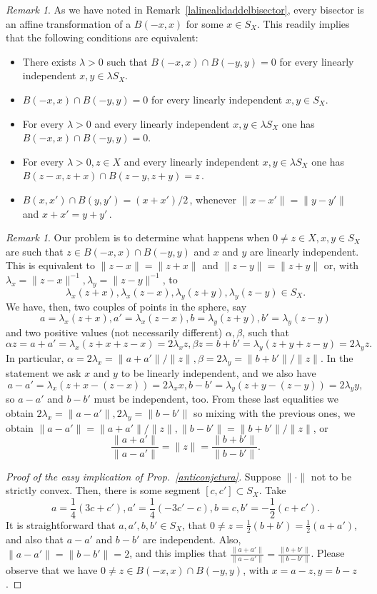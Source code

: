 \documentclass[12pt]{amsproc}
\theoremstyle{remark}
\newtheorem{nota}[theorem]{Remark}
\newtheorem{remark}[theorem]{Remark}
\def\norma{\|\cdot\|}
\begin{document}
\begin{nota}
As we have noted in Remark~\ref{lalinealidaddelbisector}, every bisector is an affine 
transformation of a $B(-x,x)$ for some $x\in S_X$. This readily implies that the following 
conditions are equivalent:
\begin{itemize}
\item There exists $\lambda>0$ such that $B(-x,x)\cap B(-y,y)=0$ for every linearly independent $x, y\in\lambda S_X$.
\item $B(-x,x)\cap B(-y,y)=0$ for every linearly independent $x, y\in S_X$.
\item For every $\lambda>0$ and every linearly independent $x, y\in\lambda S_X$ one has $B(-x,x)\cap B(-y,y)=0$.
\item For every $\lambda>0, z\in X$ and every linearly independent $x, y\in\lambda S_X$ one has $B(z-x,z+x)\cap B(z-y,z+y)=z\,$.
\item $B(x,x')\cap B(y,y')=(x+x')/2\,$, whenever $\|x-x'\|=\|y-y'\|$ and $x+x'=y+y'\,$. 
\end{itemize}
\end{nota}

\begin{remark}
Our problem is to determine what happens when $0\neq z\in X, x, y\in S_X$ 
are such that $z \in B(-x,x)\cap B(-y,y)$ and $x$ and $y$ 
are linearly independent. This is equivalent to $\|z-x\|=\|z+x\|$ and $\|z-y\|=\|z+y\|$ or, 
with $\lambda_x=\|z-x\|^{-1}, \lambda_y=\|z-y\|^{-1}$, to 
$$\lambda_x(z+x), \lambda_x(z-x),\lambda_y(z+y),\lambda_y(z-y)\in S_X.$$
We have, then, two couples of points in the sphere, say 
$$a=\lambda_x(z+x), a'=\lambda_x(z-x), b=\lambda_y(z+y), b'=\lambda_y(z-y)$$ 
and two positive values (not necessarily different) $\alpha, \beta$, such that 
$$\alpha z=a+a'=\lambda_x(z+x+z-x)=2\lambda_x z, \beta z=b+b'=\lambda_y(z+y+z-y)=2\lambda_y z.$$ 
In particular, $\alpha=2\lambda_x=\|a+a'\|/\|z\|, \beta=2\lambda_y=\|b+b'\|/\|z\|$. 
In the statement we ask $x$ and $y$ to be linearly independent, and we also have 
$$a-a'=\lambda_x(z+x-(z-x))=2\lambda_xx, b-b'=\lambda_y(z+y-(z-y))=2\lambda_yy, $$ 
so $a-a'$ and $b-b'$ must be independent, too. 
From these last equalities we obtain $2\lambda_x=\|a-a'\|, 2\lambda_y=\|b-b'\|$ so mixing 
with the previous ones, we obtain $\|a-a'\|=\|a+a'\|/\|z\|, \|b-b'\|=\|b+b'\|/\|z\|$, or 
$$\frac {\|a+a'\|}{\|a-a'\|}=\|z\|=\frac {\|b+b'\|}{\|b-b'\|}.$$ 
\end{remark}

\begin{proof}[Proof of the easy implication of Prop.~\ref{anticonjetura}] 

Suppose $\norma$ not to be strictly convex. Then, there is some segment $[c,c']\subset S_X$. 
Take $$a=\frac 14(3c+c'), a'=\frac 14(-3c'-c), b=c, b'=-\frac 12(c+c').$$ It is 
straightforward that $a, a', b, b'\in S_X$, that 
$0\neq z=\frac 12(b+b')=\frac 12(a+a')$, and also that $a-a'$ and $b-b'$ are independent. 
Also, $\|a-a'\|=\|b-b'\|=2$, and this implies that 
$\frac{\|a+a'\|}{\|a-a'\|}=\frac {\|b+b'\|}{\|b-b'\|}$. 
Please observe that we have $0\neq z\in B(-x,x)\cap B(-y,y)$, with 
$x=a-z, y=b-z$. 
\end{proof}
\end{document}

